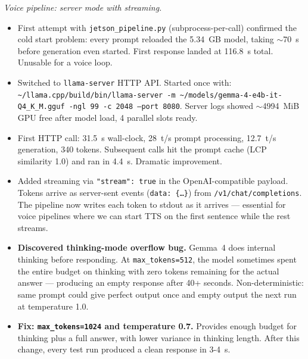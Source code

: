 \documentclass{article}
\theoremstyle{plain}
\theoremstyle{definition}
\theoremstyle{remark}
\begin{document}
\textit{Voice pipeline: server mode with streaming.}
\begin{itemize}
\item First attempt with \texttt{jetson\_pipeline.py} (subprocess-per-call) confirmed the cold start problem: every prompt reloaded the 5.34~GB model, taking $\sim$70~s before generation even started. First response landed at 116.8~s total. Unusable for a voice loop.
\item Switched to \texttt{llama-server} HTTP API. Started once with: \texttt{\~{}/llama.cpp/build/bin/llama-server -m \~{}/models/gemma-4-e4b-it-Q4\_K\_M.gguf -ngl 99 -c 2048 --port 8080}. Server logs showed $\sim$4994~MiB GPU free after model load, 4 parallel slots ready.
\item First HTTP call: 31.5~s wall-clock, 28~t/s prompt processing, 12.7~t/s generation, 340 tokens. Subsequent calls hit the prompt cache (LCP similarity 1.0) and ran in 4.4~s. Dramatic improvement.
\item Added streaming via \texttt{"stream": true} in the OpenAI-compatible payload. Tokens arrive as server-sent events (\texttt{data: \{\ldots\}}) from \texttt{/v1/chat/completions}. The pipeline now writes each token to stdout as it arrives --- essential for voice pipelines where we can start TTS on the first sentence while the rest streams.
\item \textbf{Discovered thinking-mode overflow bug.} Gemma~4 does internal thinking before responding. At \texttt{max\_tokens=512}, the model sometimes spent the entire budget on thinking with zero tokens remaining for the actual answer --- producing an empty response after 40+ seconds. Non-deterministic: same prompt could give perfect output once and empty output the next run at temperature 1.0.
\item \textbf{Fix: \texttt{max\_tokens=1024} and temperature 0.7.} Provides enough budget for thinking plus a full answer, with lower variance in thinking length. After this change, every test run produced a clean response in 3-4~s.
\end{itemize}
\end{document}
